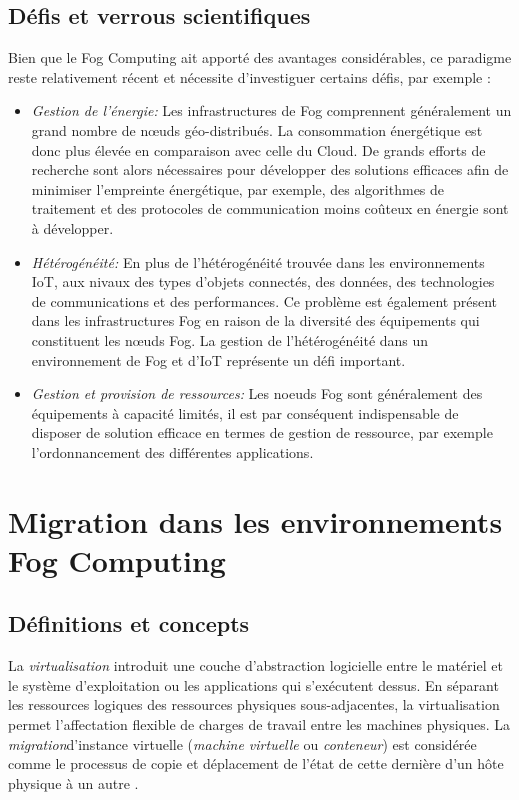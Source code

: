 \subsection{Défis et verrous scientifiques}
Bien que le Fog Computing ait apporté des avantages considérables, ce paradigme reste relativement récent et nécessite  d'investiguer certains défis, par exemple :
\begin{itemize}
  \item \emph{Gestion de l'énergie:} Les infrastructures de Fog comprennent généralement un grand nombre de nœuds géo-distribués. La consommation énergétique est donc plus élevée en comparaison avec celle du Cloud. De grands efforts de recherche sont alors nécessaires pour développer des solutions efficaces afin de minimiser l'empreinte énergétique, par exemple, des algorithmes de traitement et des protocoles de communication moins coûteux en énergie sont à développer.
  \item \emph{Hétérogénéité:} En plus de l'hétérogénéité trouvée dans les environnements IoT, aux nivaux des types d'objets connectés, des données, des technologies de communications et des performances. Ce problème est également présent dans les infrastructures Fog en raison de la diversité des équipements qui constituent les nœuds Fog. La gestion de l'hétérogénéité dans un environnement de Fog et d'IoT représente un défi important.
  \item \emph{Gestion et provision de ressources:} Les noeuds Fog sont généralement des équipements à capacité limités, il est par conséquent indispensable de disposer de solution efficace en termes de gestion de ressource, par exemple l'ordonnancement des différentes applications.
\end{itemize}
\section{Migration dans les environnements Fog Computing}

\subsection{Définitions et concepts}
La \emph{\gls{virtualisation}} introduit une couche d'abstraction logicielle entre le matériel et le système d'exploitation ou les applications qui s'exécutent dessus. En séparant les ressources logiques des ressources physiques sous-adjacentes, la virtualisation permet l'affectation flexible de charges de travail entre les machines physiques.
La \emph{\gls{migration}}d'instance virtuelle (\emph{\gls{machine virtuelle}} ou \emph{\gls{conteneur}}) est considérée comme le processus de copie et déplacement de l'état de cette dernière d'un hôte physique à un autre \cite{boutaba2013}.\par
